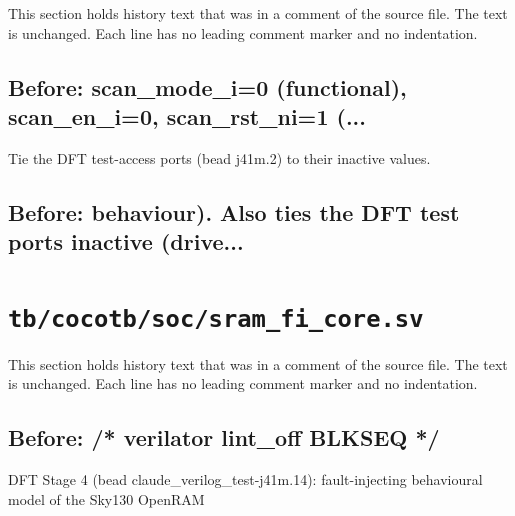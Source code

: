 This section holds history text that was in a comment of the source file. The text is unchanged. Each line has no leading comment marker and no indentation.

\begin{record}

\subsection*{Before: scan\_mode\_i=0 (functional), scan\_en\_i=0, scan\_rst\_ni=1 (...}

\begin{textblock}
Tie the DFT test-access ports (bead j41m.2) to their inactive values.
\end{textblock}

\subsection*{Before: behaviour). Also ties the DFT test ports inactive (drive...}


\end{record}

\section{\texttt{tb/cocotb/soc/sram\_fi\_core.sv}}\label{cr:suite:soc-sram-fi-core-sv}

This section holds history text that was in a comment of the source file. The text is unchanged. Each line has no leading comment marker and no indentation.

\begin{record}

\subsection*{Before: /* verilator lint\_off BLKSEQ */}

\begin{textblock}
DFT Stage 4 (bead claude_verilog_test-j41m.14): fault-injecting behavioural model of the Sky130 OpenRAM
\end{textblock}

\end{record}


